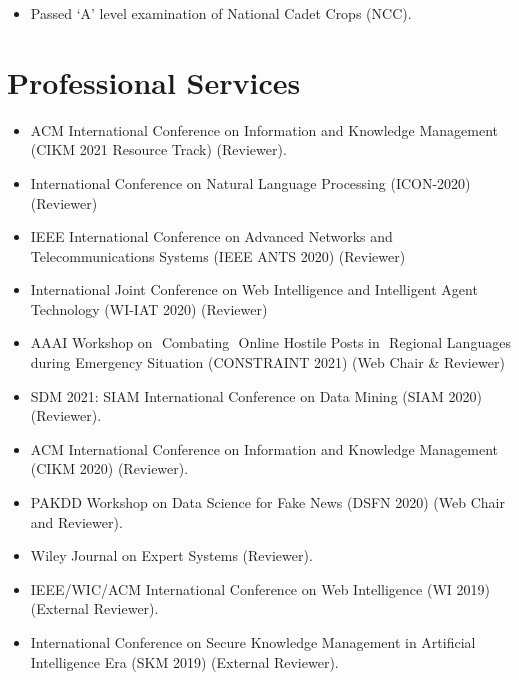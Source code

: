 \documentclass[margin, centered]{res}
\begin{document}
\begin{resume}
\begin{itemize}[leftmargin=*]
 \item Passed `A' level examination of National Cadet Crops (NCC).
\end{itemize}

\section{Professional Services}
\begin{itemize}[leftmargin=*]
   \item ACM International Conference on Information and Knowledge Management (CIKM 2021 Resource Track) (Reviewer).
    \item International Conference on Natural Language Processing (ICON-2020) (Reviewer)
    \item IEEE International Conference on Advanced Networks and Telecommunications Systems (IEEE ANTS 2020) (Reviewer)
    \item International Joint Conference on Web Intelligence and Intelligent Agent Technology (WI-IAT 2020) (Reviewer)
	\item AAAI Workshop on ​ Combating ​ On​line Ho​st​ile Posts in ​ Regional L​anguages dur​ing Emerge​ncy Si​tuation (CONSTRAINT 2021) (Web Chair & Reviewer)
	\item SDM 2021: SIAM International Conference on Data Mining (SIAM 2020) (Reviewer).
	\item ACM International Conference on Information and Knowledge Management (CIKM 2020) (Reviewer).
	\item PAKDD Workshop on Data Science for Fake News (DSFN 2020) (Web Chair and Reviewer).
	\item Wiley Journal on Expert Systems (Reviewer).
	\item IEEE/WIC/ACM International Conference on Web Intelligence (WI 2019) (External Reviewer).
	\item International Conference on Secure Knowledge Management in Artificial Intelligence Era (SKM 2019) (External Reviewer).
\end{itemize}


\end{resume}
\end{document}
